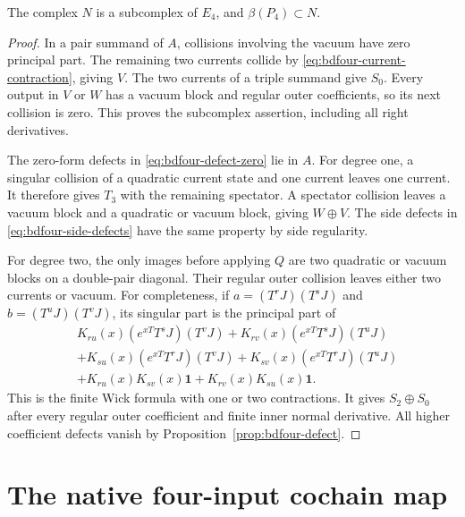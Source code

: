 \begin{lemma}\label{lem:bdfour-N-subcomplex}
The complex $N$ is a subcomplex of $E_4$, and $\beta(P_4)\subset N$.
\end{lemma}
\begin{proof}
In a pair summand of $A$, collisions involving the vacuum have zero principal part.
The remaining two currents collide by \eqref{eq:bdfour-current-contraction}, giving $V$.
The two currents of a triple summand give $S_0$.
Every output in $V$ or $W$ has a vacuum block and regular outer coefficients, so its next collision is zero.
This proves the subcomplex assertion, including all right derivatives.

The zero-form defects in \eqref{eq:bdfour-defect-zero} lie in $A$.
For degree one, a singular collision of a quadratic current state and one current leaves one current.
It therefore gives $T_3$ with the remaining spectator.
A spectator collision leaves a vacuum block and a quadratic or vacuum block, giving $W\oplus V$.
The side defects in \eqref{eq:bdfour-side-defects} have the same property by side regularity.

For degree two, the only images before applying $Q$ are two quadratic or vacuum blocks on a double-pair diagonal.
Their regular outer collision leaves either two currents or vacuum.
For completeness, if $a=(T^rJ)(T^sJ)$ and $b=(T^uJ)(T^vJ)$, its singular part is the principal part of
\[
 \begin{aligned}
 &K_{ru}(x)(e^{xT}T^sJ)(T^vJ)
 +K_{rv}(x)(e^{xT}T^sJ)(T^uJ)\\
 &+K_{su}(x)(e^{xT}T^rJ)(T^vJ)
 +K_{sv}(x)(e^{xT}T^rJ)(T^uJ)\\
 &+K_{ru}(x)K_{sv}(x)\mathbf1
 +K_{rv}(x)K_{su}(x)\mathbf1.
 \end{aligned}
\]
This is the finite Wick formula with one or two contractions.
It gives $S_2\oplus S_0$ after every regular outer coefficient and finite inner normal derivative.
All higher coefficient defects vanish by Proposition~\ref{prop:bdfour-defect}.
\end{proof}

\section{The native four-input cochain map}

